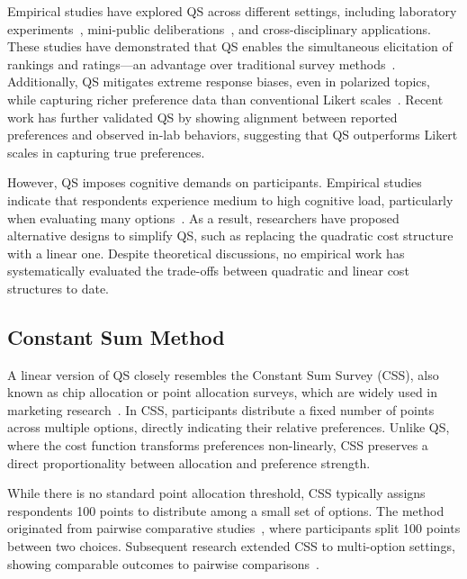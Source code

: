 Empirical studies have explored QS across different settings, including laboratory experiments~\cite{}, mini-public deliberations~\cite{}, and cross-disciplinary applications. These studies have demonstrated that QS enables the simultaneous elicitation of rankings and ratings—an advantage over traditional survey methods~\cite{chengCanShowWhat2021}. Additionally, QS mitigates extreme response biases, even in polarized topics, while capturing richer preference data than conventional Likert scales~\cite{quarfoot2017quadratic, cavaille2024cares, chengCanShowWhat2021, naylor2017first}. Recent work has further validated QS by showing alignment between reported preferences and observed in-lab behaviors, suggesting that QS outperforms Likert scales in capturing true preferences.

However, QS imposes cognitive demands on participants. Empirical studies indicate that respondents experience medium to high cognitive load, particularly when evaluating many options~\cite{cavaille2024cares, chengCanShowWhat2021}. As a result, researchers have proposed alternative designs to simplify QS, such as replacing the quadratic cost structure with a linear one. Despite theoretical discussions, no empirical work has systematically evaluated the trade-offs between quadratic and linear cost structures to date.

\subsection{Constant Sum Method}
\label{sec:related_works_css}
A linear version of QS closely resembles the Constant Sum Survey (CSS), also known as chip allocation or point allocation surveys, which are widely used in marketing research~\cite{}. In CSS, participants distribute a fixed number of points across multiple options, directly indicating their relative preferences. Unlike QS, where the cost function transforms preferences non-linearly, CSS preserves a direct proportionality between allocation and preference strength.

While there is no standard point allocation threshold, CSS typically assigns respondents 100 points to distribute among a small set of options. The method originated from pairwise comparative studies~\cite{metfesselProposalQuantitativeReporting1947}, where participants split 100 points between two choices. Subsequent research extended CSS to multi-option settings, showing comparable outcomes to pairwise comparisons~\cite{}.


